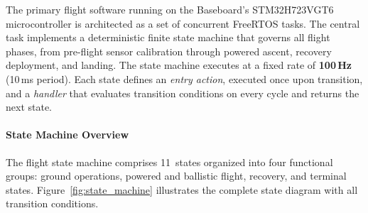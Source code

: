 \newcommand{\cfg}[1]{\texttt{\seqsplit{#1}}}

The primary flight software running on the Baseboard's STM32H723VGT6 microcontroller is architected as a set of concurrent FreeRTOS tasks. The central task implements a deterministic finite state machine that governs all flight phases, from pre-flight sensor calibration through powered ascent, recovery deployment, and landing. The state machine executes at a fixed rate of \textbf{100\,Hz} (10\,ms period). Each state defines an \emph{entry action}, executed once upon transition, and a \emph{handler} that evaluates transition conditions on every cycle and returns the next state.

\paragraph{State Machine Overview}

The flight state machine comprises 11~states organized into four functional groups: ground operations, powered and ballistic flight, recovery, and terminal states. Figure~\ref{fig:state_machine} illustrates the complete state diagram with all transition conditions.

